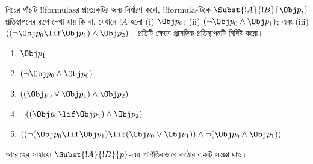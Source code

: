 \documentclass[../../../include/open-logic-section]{subfiles}
\begin{document}
\begin{prob} নিচের পাঁচটি !!{formula}sর প্রত্যেকটির জন্য নির্ধারণ করো,
 !!{formula}-টিকে \( \Subst{!A}{!B}{\Obj p_i} \) প্রতিস্থাপনের রূপে
 লেখা যায় কি না, যেখানে \( !A \) হলো (i) \( \Obj p_0 \); (ii)
 \( ( \lnot \Obj p_0 \land \Obj p_1) \); এবং (iii)
 \( ( ( \lnot \Obj p_0 \lif \Obj p_1 ) \land \Obj p_2 ) \)।
 প্রতিটি ক্ষেত্রে প্রাসঙ্গিক প্রতিস্থাপনটি নির্দিষ্ট করো।
  \begin{enumerate}
    \item \( \Obj p_1 \)
    \item \( ( \lnot \Obj p_0 \land \Obj p_0 ) \)
    \item \( ( ( \Obj p_0 \lor \Obj p_1 ) \land \Obj p_2 )  \)
    \item \( \lnot ( ( \Obj p_0 \lif \Obj p_1 ) \land \Obj p_2 ) \)
    \item \( (( \lnot ( \Obj p_0 \lif \Obj p_1 ) \lif ( \Obj p_0 \lor \Obj p_1 )) \land \lnot ( \Obj p_0 \land \Obj p_1 )) \)
  \end{enumerate}
\end{prob}

\begin{prob}
আরোহের সাহায্যে $\Subst{!A}{!B}{p}$-এর গাণিতিকভাবে কঠোর একটি সংজ্ঞা দাও।
\end{prob}
\end{document}
